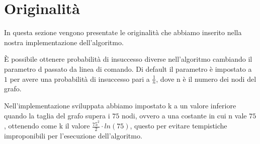\chapter{Originalità\label{sec:originalita}}
\noindent In questa sezione vengono presentate le originalità che abbiamo inserito nella nostra implementazione dell'algoritmo.

È possibile ottenere probabilità di insuccesso diverse nell'algoritmo cambiando il parametro d passato da linea di comando.
Di default il parametro è impostato a $1$ per avere una probabilità di insuccesso pari a \(\frac{1}{n}\), dove n è il numero dei nodi del grafo.

Nell'implementazione sviluppata abbiamo impostato k a un valore inferiore quando la taglia del grafo supera i $75$ nodi, ovvero a una costante in cui n vale $75$, ottenendo come k il valore \(\frac{75^{2}}{2}\cdot ln(75)\), questo per evitare tempistiche improponibili per l'esecuzione dell'algoritmo.